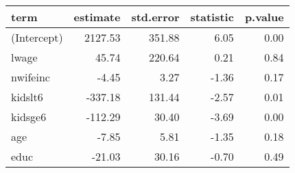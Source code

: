\begin{tabular}{lrrrr}
  \hline
term & estimate & std.error & statistic & p.value \\ 
  \hline
(Intercept) & 2127.53 & 351.88 & 6.05 & 0.00 \\ 
  lwage & 45.74 & 220.64 & 0.21 & 0.84 \\ 
  nwifeinc & -4.45 & 3.27 & -1.36 & 0.17 \\ 
  kidslt6 & -337.18 & 131.44 & -2.57 & 0.01 \\ 
  kidsge6 & -112.29 & 30.40 & -3.69 & 0.00 \\ 
  age & -7.85 & 5.81 & -1.35 & 0.18 \\ 
  educ & -21.03 & 30.16 & -0.70 & 0.49 \\ 
   \hline
\end{tabular}
